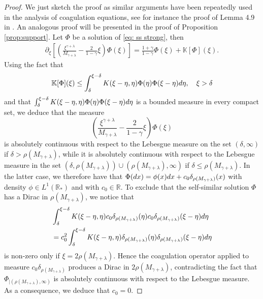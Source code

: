 \documentclass[11pt]{article}
\numberwithin{equation}{section}
\theoremstyle{plain}
\newcommand{\der}{\textup{d}}
\begin{document}
\begin{proof}
We just sketch the proof as similar arguments have been repeatedly used in the analysis of coagulation equations, see for instance the proof of Lemma 4.9 in \cite{ferreira2021self}. An analogous proof will be presented in the proof of Proposition \ref{prop:support}. 
Let $\Phi$ be a solution of \eqref{eq: ss strong}, then 
\begin{align*} 
\partial_\xi \left[ \left( \frac{\xi^{\gamma + \lambda}}{M_{\gamma +\lambda} } - \frac{2}{1-\gamma} \xi \right) \Phi(\xi) \right] = \frac{1+\gamma}{1-\gamma} \Phi(\xi) + \mathbb K [\Phi](\xi).
\end{align*} 
Using the fact that 
\[
\mathbb K [\Phi] (\xi) \leq \int_{\delta}^{\xi-\delta} K(\xi-\eta,\eta) \Phi(\eta) \Phi(\xi-\eta) \der \eta,   \quad \xi > \delta
\]
and that $\int_{\delta}^{\xi-\delta} K(\xi-\eta,\eta) \Phi(\eta) \Phi(\xi-\eta) \der \eta $ is a bounded measure in every compact set, we deduce that the measure 
\[ 
\left( \frac{\xi^{\gamma + \lambda}}{M_{\gamma +\lambda} } - \frac{2}{1-\gamma} \xi \right) \Phi(\xi)
\] 
is  absolutely continuous with respect to the Lebesgue measure on the set $(\delta, \infty )$ if $\delta > \rho(M_{\gamma+\lambda})$, while it
is absolutely continuous with respect to the Lebesgue measure  in the set $(\delta,\rho(M_{\gamma +\lambda})) \cup (\rho(M_{\gamma+\lambda}), \infty )$ if $\delta \leq \rho(M_{\gamma+\lambda})$. In the latter case, we therefore have that $\Phi(\der x )=\phi(x) \der x + c_0 \delta_{\rho(M_{\gamma+\lambda})}(x) $
with density $\phi \in L^1(\mathbb R_*) $ and with $c_0 \in \mathbb R$.
To exclude that the self-similar solution $\Phi$ has a Dirac in $\rho(M_{\gamma+\lambda})$,
we notice that
\begin{align*}
&\int_\delta^{\xi-\delta } K(\xi- \eta , \eta) c_0\delta_{\rho(M_{\gamma+\lambda})}(\eta ) c_0 \delta_{\rho(M_{\gamma+\lambda})}(\xi -\eta) \der \eta \\
&= c_0^2 \int_\delta^{\xi-\delta} K(\xi-\eta , \eta) \delta_{\rho(M_{\gamma+\lambda})} (\eta) \delta_{\rho(M_{\gamma+\lambda})}(\xi-\eta) \der \eta
\end{align*} 
is non-zero only if $\xi= 2 \rho(M_{\gamma+\lambda}) $.
Hence the coagulation operator applied to measure $c_0 \delta_{\rho(M_{\gamma+\lambda})}$ produces a Dirac in $2 \rho(M_{\gamma+\lambda})$, contradicting the fact that $\Phi_{|(\rho(M_{\gamma+\lambda}), \infty)}$ is absolutely continuous with respect to the Lebesgue measure. As a consequence, we deduce that $c_0=0$. 
\end{proof} 
\end{document}
